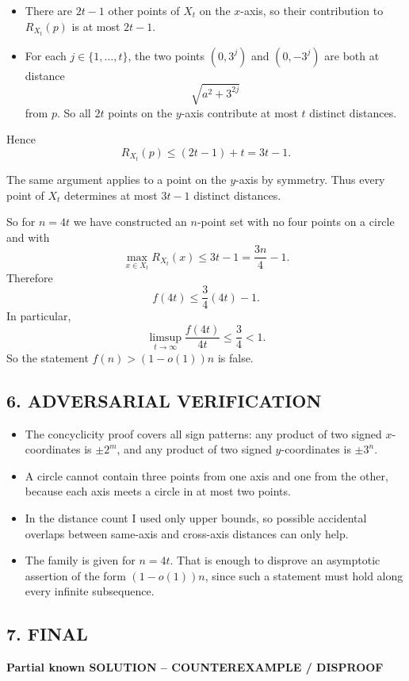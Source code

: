 \begin{itemize}
\item There are $2t-1$ other points of $X_t$ on the $x$-axis, so their contribution to $R_{X_t}(p)$ is at most $2t-1$.
\item For each $j\in\{1,\dots,t\}$, the two points $(0,3^j)$ and $(0,-3^j)$ are both at distance
\[
\sqrt{a^2+3^{2j}}
\]
from $p$.  So all $2t$ points on the $y$-axis contribute at most $t$ distinct distances.
\end{itemize}
Hence
\[
R_{X_t}(p)\le (2t-1)+t=3t-1.
\]

The same argument applies to a point on the $y$-axis by symmetry.  Thus every point of $X_t$ determines at most $3t-1$ distinct distances.

So for $n=4t$ we have constructed an $n$-point set with no four points on a circle and with
\[
\max_{x\in X_t}R_{X_t}(x)\le 3t-1=\frac{3n}{4}-1.
\]
Therefore
\[
f(4t)\le \frac{3}{4}(4t)-1.
\]
In particular,
\[
\limsup_{t\to\infty}\frac{f(4t)}{4t}\le \frac{3}{4}<1.
\]
So the statement $f(n)>(1-o(1))n$ is false.

\subsection*{6. ADVERSARIAL VERIFICATION}

\begin{itemize}
\item The concyclicity proof covers all sign patterns: any product of two signed $x$-coordinates is $\pm 2^m$, and any product of two signed $y$-coordinates is $\pm 3^n$.
\item A circle cannot contain three points from one axis and one from the other, because each axis meets a circle in at most two points.
\item In the distance count I used only upper bounds, so possible accidental overlaps between same-axis and cross-axis distances can only help.
\item The family is given for $n=4t$.  That is enough to disprove an asymptotic assertion of the form $(1-o(1))n$, since such a statement must hold along every infinite subsequence.
\end{itemize}

\subsection*{7. FINAL}

\textbf{Partial known SOLUTION -- COUNTEREXAMPLE / DISPROOF}

